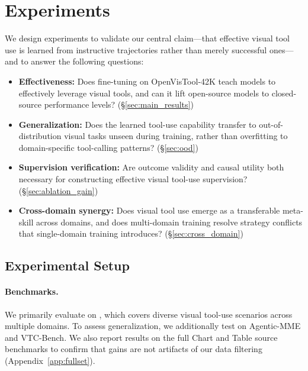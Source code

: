 

\section{Experiments}
\label{sec:experiments}

We design experiments to validate our central claim—that effective visual tool use is learned from instructive trajectories rather than merely successful ones—and to answer the following questions:
\begin{itemize}
    \item \textbf{Effectiveness:} Does fine-tuning on OpenVisTool-42K teach models to effectively leverage visual tools, and can it lift open-source models to closed-source performance levels? (\S\ref{sec:main_results})
    
    \item \textbf{Generalization:} Does the learned tool-use capability transfer to out-of-distribution visual tasks unseen during training, rather than overfitting to domain-specific tool-calling patterns? (\S\ref{sec:ood})
    
    \item \textbf{Supervision verification:} Are outcome validity and causal utility both necessary for constructing effective visual tool-use supervision? (\S\ref{sec:ablation_gain})
    
    \item \textbf{Cross-domain synergy:} Does visual tool use emerge as a transferable meta-skill across domains, and does multi-domain training resolve strategy conflicts that single-domain training introduces? (\S\ref{sec:cross_domain})
\end{itemize}




\subsection{Experimental Setup}
\label{sec:setup}

\paragraph{Benchmarks.}
We primarily evaluate on \benchname, which covers diverse visual tool-use scenarios across multiple domains. To assess generalization, we additionally test on Agentic-MME and VTC-Bench. We also report results on the full Chart and Table source benchmarks to confirm that gains are not artifacts of our data filtering (Appendix~\ref{app:fullset}).


